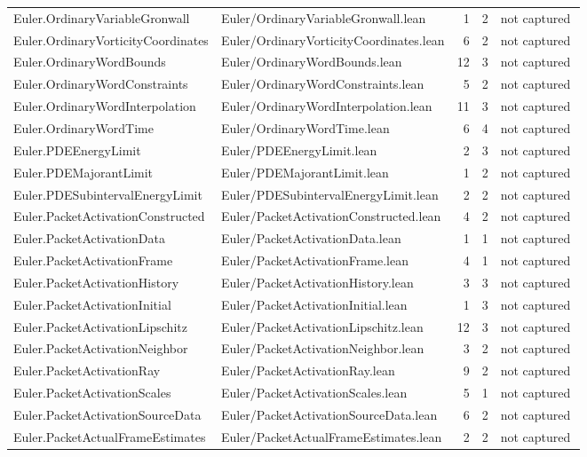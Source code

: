 \documentclass[10pt]{article}
\begin{document}
\begin{longtable}{p{0.28\linewidth}p{0.27\linewidth}r r p{0.20\linewidth}}
Euler.OrdinaryVariableGronwall & Euler/OrdinaryVariableGronwall.lean & 1 & 2 & not captured\\
Euler.OrdinaryVorticityCoordinates & Euler/OrdinaryVorticityCoordinates.lean & 6 & 2 & not captured\\
Euler.OrdinaryWordBounds & Euler/OrdinaryWordBounds.lean & 12 & 3 & not captured\\
Euler.OrdinaryWordConstraints & Euler/OrdinaryWordConstraints.lean & 5 & 2 & not captured\\
Euler.OrdinaryWordInterpolation & Euler/OrdinaryWordInterpolation.lean & 11 & 3 & not captured\\
Euler.OrdinaryWordTime & Euler/OrdinaryWordTime.lean & 6 & 4 & not captured\\
Euler.PDEEnergyLimit & Euler/PDEEnergyLimit.lean & 2 & 3 & not captured\\
Euler.PDEMajorantLimit & Euler/PDEMajorantLimit.lean & 1 & 2 & not captured\\
Euler.PDESubintervalEnergyLimit & Euler/PDESubintervalEnergyLimit.lean & 2 & 2 & not captured\\
Euler.PacketActivationConstructed & Euler/PacketActivationConstructed.lean & 4 & 2 & not captured\\
Euler.PacketActivationData & Euler/PacketActivationData.lean & 1 & 1 & not captured\\
Euler.PacketActivationFrame & Euler/PacketActivationFrame.lean & 4 & 1 & not captured\\
Euler.PacketActivationHistory & Euler/PacketActivationHistory.lean & 3 & 3 & not captured\\
Euler.PacketActivationInitial & Euler/PacketActivationInitial.lean & 1 & 3 & not captured\\
Euler.PacketActivationLipschitz & Euler/PacketActivationLipschitz.lean & 12 & 3 & not captured\\
Euler.PacketActivationNeighbor & Euler/PacketActivationNeighbor.lean & 3 & 2 & not captured\\
Euler.PacketActivationRay & Euler/PacketActivationRay.lean & 9 & 2 & not captured\\
Euler.PacketActivationScales & Euler/PacketActivationScales.lean & 5 & 1 & not captured\\
Euler.PacketActivationSourceData & Euler/PacketActivationSourceData.lean & 6 & 2 & not captured\\
Euler.PacketActualFrameEstimates & Euler/PacketActualFrameEstimates.lean & 2 & 2 & not captured\\

\end{longtable}
\end{document}
